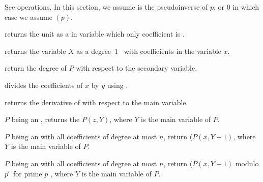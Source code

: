  See  operations.
In this section, we assume  is the pseudoinverse of $p$, or $0$ in
which case we assume $(p)$.

 returns the unit  as a
 in variable  which only coefficient is .

 returns the variable $X$ as a
degree~1~ with  coefficients in the variable $x$.

 return the degree of $P$ with respect to
the secondary variable.










 divides the coefficients of $x$
by $y$ using .

 returns the derivative of  with
respect to the main variable.



 $P$ being an , returns
the  $P(z,Y)$, where $Y$ is the main variable of $P$.


 $P$ being an  with
all coefficients of degree at most $n$, return $(P(x,Y+1)$, where $Y$ is the
main variable of $P$.

$P$ being an  with all coefficients of degree at most $n$, return
$(P(x,Y+1)$  modulo $p^e$ for prime $p$ , where $Y$ is the main variable of
$P$.

